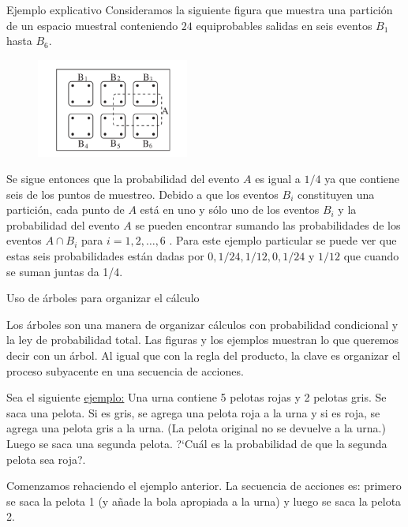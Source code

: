\documentclass[10pt]{beamer}
\begin{document}
\begin{frame}{Ejemplo explicativo}
\small{Consideramos la siguiente figura que muestra una partici\'on de un espacio muestral conteniendo $24$ equiprobables salidas en seis eventos $B_1$ hasta $B_6$.}
 
 \begin{figure}[h]
 	\centering
 	\includegraphics[width=5cm]{g3}
 \end{figure}
 
\vspace{0.3cm}

\scriptsize{Se sigue entonces que la probabilidad del evento $A$ es igual a $1/4$ ya que contiene seis de los puntos de muestreo. Debido a que los eventos $B_i$ constituyen una partici\'on, cada punto de $A$ est\'a en uno y s\'olo uno de los eventos $B_i$ y la probabilidad del evento $A$ se pueden encontrar sumando las probabilidades de los eventos $A \cap B_i$ para $i = 1,2, \dots,6$ . Para este ejemplo particular se puede ver que estas seis probabilidades est\'an dadas por $0, 1/24, 1/12, 0, 1/24$  y $1/12$ que cuando se suman juntas da 1/4.}

\end{frame}

\begin{frame}{Uso de \'arboles para organizar el c\'alculo}
\small{Los \'arboles son una  manera de organizar c\'alculos con probabilidad condicional y la ley de probabilidad total. Las figuras y los ejemplos muestran  lo que queremos decir con un \'arbol. Al igual que con la regla del producto, la clave es organizar el proceso subyacente en una secuencia de acciones.

\vspace{0.2cm}

Sea el siguiente \underline{ejemplo:} Una urna contiene 5 pelotas rojas y 2 pelotas gris. Se saca una pelota. Si es gris, se agrega una pelota roja a la urna y si es roja, se agrega una pelota gris a la urna. (La pelota original no se devuelve a la urna.) Luego se saca una segunda pelota. ?`Cu\'al es la probabilidad de que la segunda pelota sea roja?.

\vspace{0.2cm}

Comenzamos rehaciendo el ejemplo anterior. La secuencia de acciones es: primero se saca  la pelota 1 (y a\~nade la bola apropiada a la urna) y luego se saca  la pelota 2.}
\end{frame}
\end{document}
